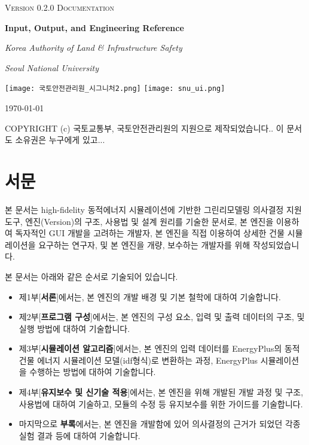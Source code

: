 \documentclass[oneside,openany,a4paper,12pt]{book}
\begin{document}
\pagestyle{plain} 


\listoftodos

\begin{titlepage}
  \centering
  {\scshape\large \simulator Version 0.2.0 Documentation\par}
  \vspace{6em}
  {\bfseries\Huge Input, Output, and Engineering Reference\par}
  \vspace{1em}
  {\itshape\Large Korea Authority of Land \& Infrastructure Safety\par}
  {\itshape\Large Seoul National University\par}
  \vfill
  \texttt{[image: 국토안전관리원\_시그니처2.png]}
  \hspace{4em}
  \texttt{[image: snu\_ui.png]}
  \vfill
  {\large \today \par}
  \vspace{0.5em}
  {\small COPYRIGHT (c) \simulator\는 국토교통부, 국토안전관리원의 지원으로 제작되었습니다.. 이 문서도 소유권은 누구에게 있고...}
\end{titlepage}

\section*{서문}
본 문서는 high-fidelity 동적에너지 시뮬레이션에 기반한 그린리모델링 의사결정 지원 도구, \simulator 엔진(Version\simulatorversion)의 구조, 사용법 및 설계 원리를 기술한 문서로, 본 엔진을 이용하여 독자적인 GUI 개발을 고려하는 개발자, 본 엔진을 직접 이용하여 상세한 건물 시뮬레이션을 요구하는 연구자, 및 본 엔진을 개량, 보수하는 개발자를 위해 작성되었습니다.

본 문서는 아래와 같은 순서로 기술되어 있습니다.
\begin{itemize}
  \item 제1부[{\bfseries 서론}]에서는, 본 엔진의 개발 배경 및 기본 철학에 대하여 기술합니다.
  \item 제2부[{\bfseries 프로그램 구성}]에서는, 본 엔진의 구성 요소, 입력 및 출력 데이터의 구조, 및 실행 방법에 대하여 기술합니다.
  \item 제3부[{\bfseries 시뮬레이션 알고리즘}]에서는, 본 엔진의 입력 데이터를 EnergyPlus의 동적 건물 에너지 시뮬레이션 모델(idf형식)로 변환하는 과정, EnergyPlus 시뮬레이션을 수행하는 방법에 대하여 기술합니다.
  \item 제4부[{\bfseries 유지보수 및 신기술 적용}]에서는, 본 엔진을 위해 개발된  개발 과정 및 구조, 사용법에 대하여 기술하고, 모듈의 수정 등 유지보수를 위한 가이드를 기술합니다.
  \item 마지막으로 {\bfseries 부록}에서는, 본 엔진을 개발함에 있어 의사결정의 근거가 되었던 각종 실험 결과 등에 대하여 기술합니다.
\end{itemize}
\end{document}
